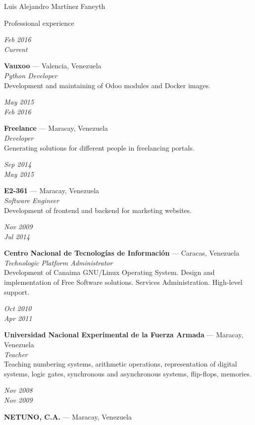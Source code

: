 \documentclass[11pt,letterpaper]{article}
\begin{document}
\begin{cv}{Luis Alejandro Mart\'inez Faneyth}
\begin{cvlist}{Professional experience}
\item[{\parbox[t]{6em}{\textit{\large{Feb 2016\\Current}}}}]{
	\parbox[t]{\linewidth}{
		\textbf{Vauxoo} --- Valencia, Venezuela\\
		\textit{Python Developer}\\
		\footnotesize{Development and maintaining of Odoo modules and Docker images.}
	}
}
\item[{\parbox[t]{6em}{\textit{\large{May 2015\\Feb 2016}}}}]{
	\parbox[t]{\linewidth}{
		\textbf{Freelance} --- Maracay, Venezuela\\
		\textit{Developer}\\
		\footnotesize{Generating solutions for different people in freelancing portals.}
	}
}
\item[{\parbox[t]{6em}{\textit{\large{Sep 2014\\May 2015}}}}]{
	\parbox[t]{\linewidth}{
		\textbf{E2-361} --- Maracay, Venezuela\\
		\textit{Software Engineer}\\
		\footnotesize{Development of frontend and backend for marketing websites.}
	}
}
\item[{\parbox[t]{6em}{\textit{\large{Nov 2009\\Jul 2014}}}}]{
	\parbox[t]{\linewidth}{
		\textbf{Centro Nacional de Tecnolog\'ias de Informaci\'on} --- Caracas, Venezuela\\
		\textit{Technologic Platform Administrator}\\
		\footnotesize{Development of Canaima GNU/Linux Operating System. Design and implementation of Free Software solutions. Services Administration. High-level support.}
	}
}
\item[{\parbox[t]{6em}{\textit{\large{Oct 2010\\Apr 2011}}}}]{
	\parbox[t]{\linewidth}{
		\textbf{Universidad Nacional Experimental de la Fuerza Armada} --- Maracay, Venezuela\\
		\textit{Teacher}\\
		\footnotesize{Teaching numbering systems, arithmetic operations, representation of digital systems, logic gates, synchronous and asynchronous systems, flip-flops, memories.}
	}
}
\item[{\parbox[t]{6em}{\textit{\large{Nov 2008\\Nov 2009}}}}]{
	\parbox[t]{\linewidth}{
		\textbf{NETUNO, C.A.} --- Maracay, Venezuela\\
}}
\end{cvlist}
\end{cv}
\end{document}
